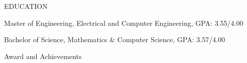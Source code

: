 \documentclass[10pt]{article}
\begin{document}
\begin{customsection}{EDUCATION}

    {Master of Engineering, Electrical and Computer Engineering, GPA: 3.55/4.00}

    {Bachelor of Science, Mathematics \& Computer Science, GPA: 3.57/4.00}

\end{customsection}
 
\begin{customsectionnoskip}{Award and Achievements}


\end{customsectionnoskip}

\end{document}
